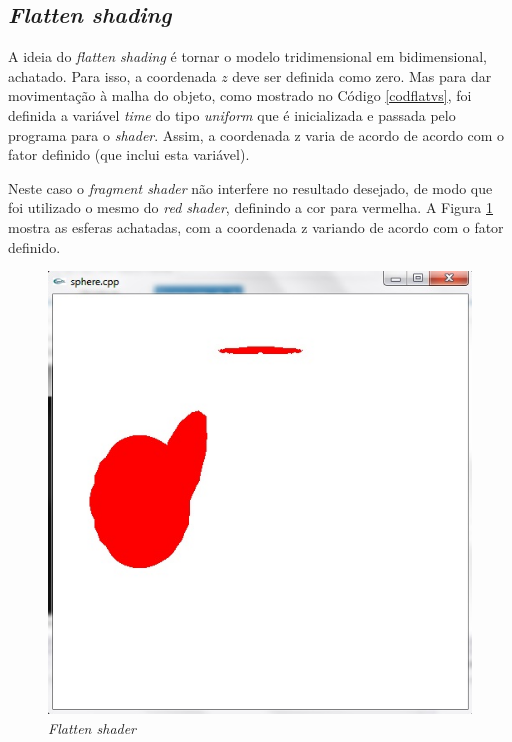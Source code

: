 \subsection{\textit{Flatten shading}}

	A ideia do \textit{flatten shading} é tornar o modelo tridimensional em bidimensional, achatado. Para isso,  a coordenada $z$ deve ser definida como zero. Mas para dar movimentação à malha do objeto, como mostrado no Código  \ref{codflatvs},  foi definida a variável  \textit{time} do tipo \textit{uniform} que é inicializada e passada pelo programa para o \textit{shader}. Assim, a coordenada z varia de acordo de acordo com o fator definido (que inclui esta variável).  

	

	Neste caso o \textit{fragment shader} não interfere no resultado desejado, de modo que foi utilizado o mesmo do \textit{red shader}, definindo a cor para vermelha. A Figura \ref{flatten_shader} mostra as esferas achatadas, com a coordenada z variando de acordo com o fator definido. 

	\begin{figure}[h]
	\centering
		\includegraphics[keepaspectratio=true,scale=0.6]{figuras/flatten_shader.jpg}
	\caption{\textit{Flatten shader}}
	\label{flatten_shader}
	\end{figure}


